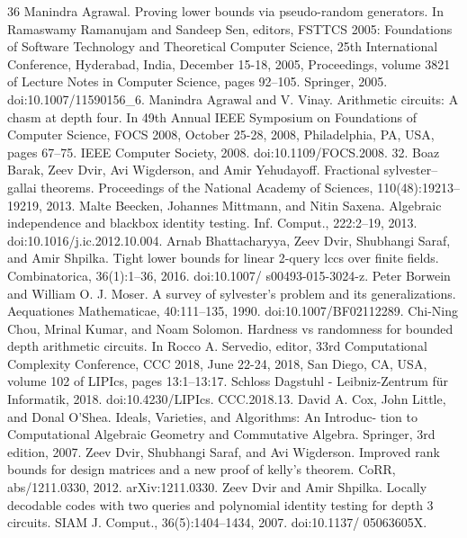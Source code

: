 \documentclass[10pt,a4paper]{article}
\begin{document}
\begin{thebibliography}{36}
Manindra Agrawal. Proving lower bounds via pseudo-random generators. In Ramaswamy Ramanujam and Sandeep Sen, editors, FSTTCS 2005: Foundations of Software Technology and Theoretical Computer Science, 25th International Conference, Hyderabad, India, December 15-18, 2005, Proceedings, volume 3821 of Lecture Notes in Computer Science, pages 92–105. Springer, 2005. doi:10.1007/11590156\_6.
Manindra Agrawal and V. Vinay. Arithmetic circuits: A chasm at depth four. In 49th Annual IEEE Symposium on Foundations of Computer Science, FOCS 2008, October 25-28, 2008, Philadelphia, PA, USA, pages 67–75. IEEE Computer Society, 2008. doi:10.1109/FOCS.2008. 32.
Boaz Barak, Zeev Dvir, Avi Wigderson, and Amir Yehudayoff. Fractional sylvester–gallai theorems. Proceedings of the National Academy of Sciences, 110(48):19213–19219, 2013.
Malte Beecken, Johannes Mittmann, and Nitin Saxena. Algebraic independence and blackbox identity testing. Inf. Comput., 222:2–19, 2013. doi:10.1016/j.ic.2012.10.004.
Arnab Bhattacharyya, Zeev Dvir, Shubhangi Saraf, and Amir Shpilka. Tight lower bounds for linear 2-query lccs over finite fields. Combinatorica, 36(1):1–36, 2016. doi:10.1007/ s00493-015-3024-z.
Peter Borwein and William O. J. Moser. A survey of sylvester’s problem and its generalizations. Aequationes Mathematicae, 40:111–135, 1990. doi:10.1007/BF02112289.
Chi-Ning Chou, Mrinal Kumar, and Noam Solomon. Hardness vs randomness for bounded depth arithmetic circuits. In Rocco A. Servedio, editor, 33rd Computational Complexity Conference, CCC 2018, June 22-24, 2018, San Diego, CA, USA, volume 102 of LIPIcs, pages 13:1–13:17. Schloss Dagstuhl - Leibniz-Zentrum für Informatik, 2018. doi:10.4230/LIPIcs. CCC.2018.13.
David A. Cox, John Little, and Donal O’Shea. Ideals, Varieties, and Algorithms: An Introduc- tion to Computational Algebraic Geometry and Commutative Algebra. Springer, 3rd edition, 2007.
Zeev Dvir, Shubhangi Saraf, and Avi Wigderson. Improved rank bounds for design matrices and a new proof of kelly’s theorem. CoRR, abs/1211.0330, 2012. arXiv:1211.0330.
Zeev Dvir and Amir Shpilka. Locally decodable codes with two queries and polynomial identity testing for depth 3 circuits. SIAM J. Comput., 36(5):1404–1434, 2007. doi:10.1137/ 05063605X.

\end{thebibliography}
\end{document}
